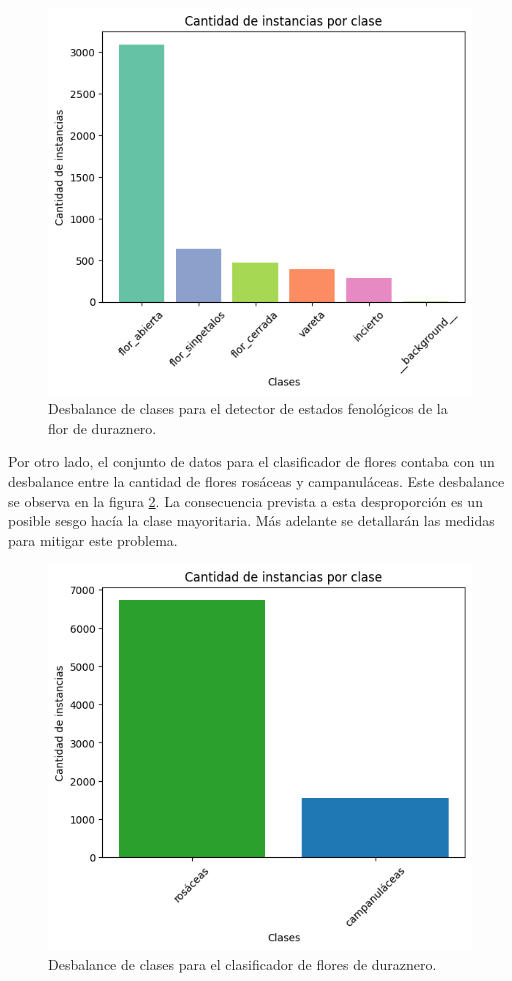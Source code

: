 \begin{figure}[ht]
	\centering
	\includegraphics[scale=.7]{./Figures/desbalanceo_detector.png}
	\caption{Desbalance de clases para el detector de estados fenológicos de la flor de duraznero.}
	\label{fig:desbalanceoDeteccion}
\end{figure}
\newpage

Por otro lado, el conjunto de datos para el clasificador de flores contaba con un desbalance entre la cantidad de flores rosáceas y campanuláceas. Este desbalance se observa en la figura \ref{fig:desbalanceoClass}. La consecuencia prevista a esta desproporción es un posible sesgo hacía la clase mayoritaria. Más adelante se detallarán las medidas para mitigar este problema.


\begin{figure}[ht]
	\centering
	\includegraphics[scale=.7]{./Figures/tipodeflor_desbalance.png}
	\caption{Desbalance de clases para el clasificador de flores de duraznero.}
	\label{fig:desbalanceoClass}
\end{figure}
\newpage
